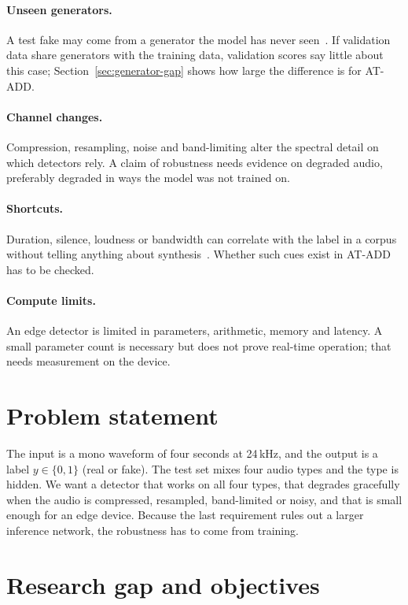 \paragraph{Unseen generators.} A test fake may come from a generator the model has never seen~\cite{xie2026atadd}. If validation data share generators with the training data, validation scores say little about this case; Section~\ref{sec:generator-gap} shows how large the difference is for AT-ADD.

\paragraph{Channel changes.} Compression, resampling, noise and band-limiting alter the spectral detail on which detectors rely. A claim of robustness needs evidence on degraded audio, preferably degraded in ways the model was not trained on.

\paragraph{Shortcuts.} Duration, silence, loudness or bandwidth can correlate with the label in a corpus without telling anything about synthesis~\cite{muller2021silver}. Whether such cues exist in AT-ADD has to be checked.

\paragraph{Compute limits.} An edge detector is limited in parameters, arithmetic, memory and latency. A small parameter count is necessary but does not prove real-time operation; that needs measurement on the device.

\section{Problem statement}

The input is a mono waveform of four seconds at 24\,kHz, and the output is a label $y\in\{0,1\}$ (real or fake). The test set mixes four audio types and the type is hidden. We want a detector that works on all four types, that degrades gracefully when the audio is compressed, resampled, band-limited or noisy, and that is small enough for an edge device. Because the last requirement rules out a larger inference network, the robustness has to come from training.

\section{Research gap and objectives}

